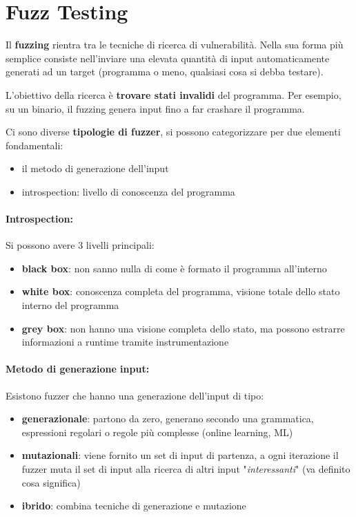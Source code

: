 \section{Fuzz Testing}

Il \textbf{fuzzing} rientra tra le tecniche di ricerca di vulnerabilità. Nella sua forma più semplice consiste nell'inviare una elevata quantità di input automaticamente generati ad un target (programma o meno, qualsiasi cosa si debba testare). 

L'obiettivo della ricerca è \textbf{trovare stati invalidi} del programma. Per esempio, su un binario, il fuzzing genera input fino a far crashare il programma.

Ci sono diverse \textbf{tipologie di fuzzer}, si possono categorizzare per due elementi fondamentali: 
\begin{itemize}
	\item il metodo di generazione dell'input
    
	\item introspection: livello di conoscenza del programma
\end{itemize}

\paragraph{Introspection:} Si possono avere 3 livelli principali: 
\begin{itemize}
	\item \textbf{black box}: non sanno nulla di come è formato il programma all'interno
	
    \item \textbf{white box}: conoscenza completa del programma, visione totale dello stato interno del programma
	
    \item \textbf{grey box}: non hanno una visione completa dello stato, ma possono estrarre informazioni a runtime tramite instrumentazione
\end{itemize}

\paragraph{Metodo di generazione input:} Esistono fuzzer che hanno una generazione dell'input di tipo: 
\begin{itemize}
	\item \textbf{generazionale}: partono da zero, generano secondo una grammatica, espressioni regolari o regole più complesse (online learning, ML)
	
    \item \textbf{mutazionali}: viene fornito un set di input di partenza, a ogni iterazione il fuzzer muta il set di input alla ricerca di altri input "\textit{interessanti}" (va definito cosa significa)
	
    \item \textbf{ibrido}: combina tecniche di generazione e mutazione
\end{itemize}

